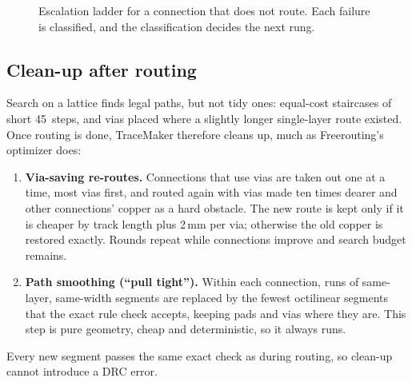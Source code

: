 \documentclass[10pt,a4paper]{article}
\begin{document}
\begin{figure}[h]
\centering
{}
\caption{Escalation ladder for a connection that does not route. Each failure is classified, and the
classification decides the next rung.}
\label{fig:ladder}
\end{figure}

\subsection{Clean-up after routing}
\label{sec:cleanup}

Search on a lattice finds legal paths, but not tidy ones: equal-cost staircases of short 45\textdegree\ steps, and vias
placed where a slightly longer single-layer route existed. Once routing is done, TraceMaker therefore cleans up,
much as Freerouting's optimizer does:
\begin{enumerate}[leftmargin=*]
  \item \textbf{Via-saving re-routes.} Connections that use vias are taken out one at a time, most vias first, and
  routed again with vias made ten times dearer and other connections' copper as a hard obstacle. The new route is kept
  only if it is cheaper by track length plus 2\,mm per via; otherwise the old copper is restored exactly. Rounds
  repeat while connections improve and search budget remains.
  \item \textbf{Path smoothing (``pull tight'').} Within each connection, runs of same-layer, same-width segments are
  replaced by the fewest octilinear segments that the exact rule check accepts, keeping pads and vias where they
  are. This step is pure geometry, cheap and deterministic, so it always runs.
\end{enumerate}
Every new segment passes the same exact check as during routing, so clean-up cannot introduce a DRC error.
\end{document}

